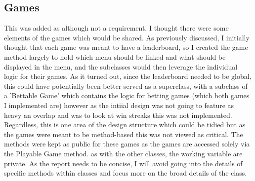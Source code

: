\documentclass{scrreprt}
\begin{document}
\subsection{Games}
This was added as although not a requirement, I thought there were some elements of the games which would be shared. As previously discussed, I initially thought that each game was meant to have a leaderboard, so I created the game method largely to hold which menu should be linked and what should be displayed in the menu, and the subclasses would then leverage the individual logic for their games. As it turned out, since the leaderboard needed to be global, this could have potentially been better served as a superclass, with a subclass of a 'Bettable Game' which contains the logic for betting games (which both games I implemented are) however as the intiial design was not going to feature as heavy an overlap and was to look at win streaks this was not implemented. Regardless, this is one area of the design structure which could be tidied but as the games were meant to be method-based this was not viewed as critical. The methods were kept as public for these games as the games are accessed solely via the Playable Game method. as with the other classes, the working variable are private. As the report needs to be concise, I will avoid going into the details of specific methods within classes and focus more on the broad details of the class.
\end{document}

